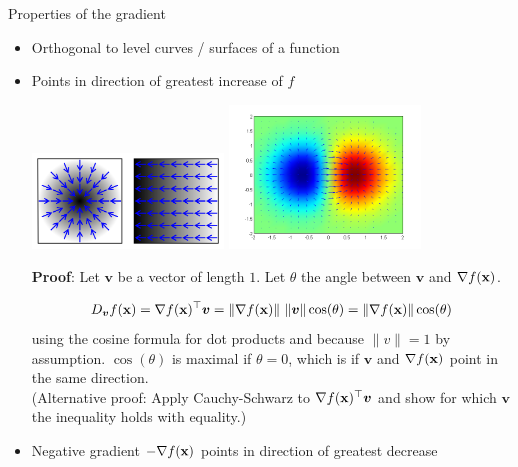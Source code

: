 \begin{vbframe}{Properties of the gradient}

\begin{itemize}
	\item Orthogonal to level curves / surfaces of a function
	\item Points in direction of greatest increase of $f$
	\begin{center}
		\includegraphics[width = 0.4\textwidth]{figure_man/gradient3.png} \includegraphics[width = 0.4\textwidth]{figure_man/gradient.png}
	\end{center}
	\begin{footnotesize}
	\textbf{Proof}: Let $\bm{v}$ be a vector of length $1$. Let $\theta$ the angle between $\bm{v}$ and $\nabla f(\mathbf{x})$. 
 
	$$
		D_{\bm{v}}f(\mathbf{x}) = \nabla f(\mathbf{x})^\top \bm{v} = \|\nabla f(\mathbf{x})\|~\|\bm{v}\|\cos(\theta) = \|\nabla f(\mathbf{x})\| \cos(\theta)
	$$
	using the cosine formula for dot products and	 because $\|v\| = 1$ by assumption. $\cos(\theta)$ is maximal if $\theta = 0$, which is if $\bm{v}$ and $\nabla f(\mathbf{x})$ point in the same direction. \\
	(Alternative proof: Apply Cauchy-Schwarz to $\nabla f(\mathbf{x})^\top \bm{v}$ and show for which $\bm{v}$ the inequality holds with equality.)  
	\end{footnotesize}
\end{itemize}


\framebreak

\begin{itemize}
	\item Negative gradient $- \nabla f(\mathbf{x})$ points in direction of greatest decrease
\end{itemize}


\end{vbframe}

